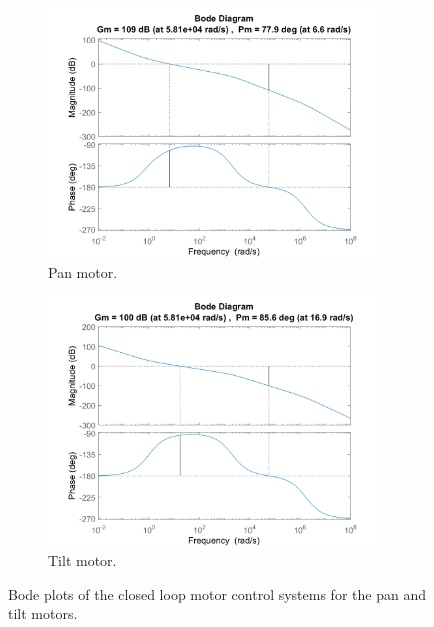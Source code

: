 \documentclass[../../main.tex]{subfiles}
\begin{document}
\begin{figure}[h]
\begin{subfigure}{0.48\textwidth}
    \includegraphics[width = 0.97\textwidth]{Sections/System_Design/Images/SM_PanMotorPos2.png}
    \caption{Pan motor.}
    \label{fig:pos_stability_plot_pan}
\end{subfigure}\quad
\begin{subfigure}{0.48\textwidth}
    \includegraphics[width = 0.97\textwidth]{Sections/System_Design/Images/SM_TiltMotorPos.png}
    \caption{Tilt motor.}
    \label{fig:pos_stability_plot_tilt}
\end{subfigure}
\caption{Bode plots of the closed loop motor control systems for the pan and tilt motors.}
\label{fig:pos_stability_plot}
\end{figure}
\end{document}
